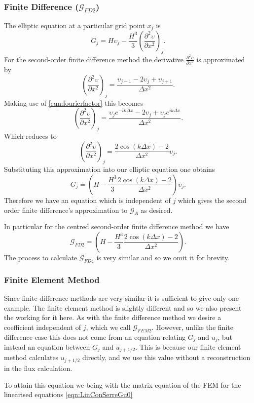 \subsubsection{Finite Difference ($\mathcal{G}_{FD2}$)}
The elliptic equation at a particular grid point $x_j$ is
\[G_j = H\upsilon_j -\frac{H^3}{3} \left(\frac{\partial^2 \upsilon}{\partial x^2}\right)_j.\]
For the second-order finite difference method the derivative $\frac{\partial^2 \upsilon}{\partial x^2}$ is approximated by   
\[ \left(\frac{\partial^2 \upsilon}{\partial x^2}\right)_j = \frac{\upsilon_{j-1} - 2\upsilon_{j} + \upsilon_{j+1}}{\Delta x^2}.\]
Making use of \eqref{eqn:fourierfactor} this becomes
\[ \left(\frac{\partial^2 \upsilon}{\partial x^2}\right)_j = \frac{\upsilon_{j} e^{-ik\Delta x} - 2\upsilon_{j} + \upsilon_{j}e^{ik\Delta x}}{\Delta x^2}.\]
Which reduces to
\[ \left(\frac{\partial^2 \upsilon}{\partial x^2}\right)_j = \frac{ 2\cos\left(k\Delta x\right) - 2 }{\Delta x^2} \upsilon_{j}.\]
Substituting this approximation into our elliptic equation one obtains
\[G_j = \left(H -\frac{H^3}{3} \frac{ 2\cos\left(k\Delta x\right) - 2 }{\Delta x^2}\right) \upsilon_{j}.\] 
Therefore we have an equation which is independent of $j$ which gives the second order finite difference's approximation to $\mathcal{G}_A$ as desired. 

In particular for the centred second-order finite difference method we have
\[\mathcal{G}_{FD2} = \left(H -\frac{H^3}{3} \frac{ 2\cos\left(k\Delta x\right) - 2 }{\Delta x^2}\right).\]
The process to calculate $\mathcal{G}_{FD4}$ is very similar and so we omit it for brevity.
\subsubsection{Finite Element Method} 
Since finite difference methods are very similar it is sufficient to give only one example. The finite element method is slightly different and so we also present the working for it here. As with the finite difference method we desire a coefficient independent of $j$, which we call $\mathcal{G}_{FEM2}$. However, unlike the finite difference case this does not come from an equation relating $G_j$ and $u_j$, but instead an equation between $G_j$ and $u_{j+1/2}$. This is because our finite element method calculates $u_{j+1/2}$ directly, and we use this value without a reconstruction in the flux calculation.

To attain this equation we being with the matrix equation of the FEM for the linearised equations \eqref{eqn:LinConSerreGu0}

